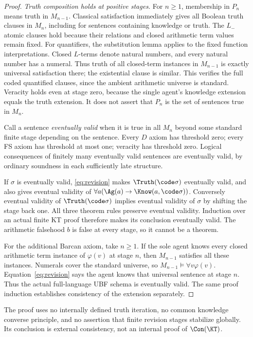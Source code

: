 \documentclass[11pt]{article}
\begin{document}
\begin{proof}
\emph{Truth composition holds at positive stages.} For $n\ge1$,
membership in $P_n$ means truth in $M_{n-1}$. Classical satisfaction
immediately gives all Boolean truth clauses in $M_n$, including for
sentences containing knowledge or truth. The $L_-$ atomic clauses
hold because their relations and closed arithmetic term values remain
fixed. For quantifiers, the substitution lemma applies to the fixed
function interpretations. Closed $L$-terms denote natural numbers,
and every natural number has a numeral. Thus truth of all closed-term
instances in $M_{n-1}$ is exactly universal satisfaction there; the
existential clause is similar. This verifies the full coded quantified
clauses, since the ambient arithmetic universe is standard. Veracity
holds even at stage zero, because the single agent's knowledge extension
equals the truth extension. It does not assert that $P_n$ is the set
of sentences true in $M_n$.

Call a sentence \emph{eventually valid} when it is true in all $M_n$
beyond some standard finite stage depending on the sentence. Every
$D$ axiom has threshold zero; every FS axiom has threshold at most
one; veracity has threshold zero. Logical consequences of finitely
many eventually valid sentences are eventually valid, by ordinary
soundness in each sufficiently late structure.

If $\sigma$ is eventually valid, \eqref{eq:revision} makes
$\Truth(\code\sigma)$ eventually valid, and also gives eventual
validity of $\forall a(\Ag(a)\to\Know(a,\code\sigma))$.
Conversely eventual validity of $\Truth(\code\sigma)$ implies
eventual validity of $\sigma$ by shifting the stage back one.
All three theorem rules preserve eventual validity. Induction over
an actual finite KT proof therefore makes its conclusion eventually
valid. The arithmetic falsehood $b$ is false at every stage, so it
cannot be a theorem.

For the additional Barcan axiom, take $n\ge1$. If the sole agent
knows every closed arithmetic term instance of $\varphi(v)$ at stage
$n$, then $M_{n-1}$ satisfies all these instances. Numerals cover the
standard universe, so $M_{n-1}\models\forall v\varphi(v)$.
Equation~\eqref{eq:revision} says the agent knows that universal
sentence at stage $n$. Thus the actual full-language UBF schema is
eventually valid. The same proof induction establishes consistency
of the extension separately.
\end{proof}

The proof uses no internally defined truth iteration, no common
knowledge converse principle, and no assertion that finite revision
stages stabilize globally. Its conclusion is external consistency,
not an internal proof of $\Con(\KT)$.
\end{document}
